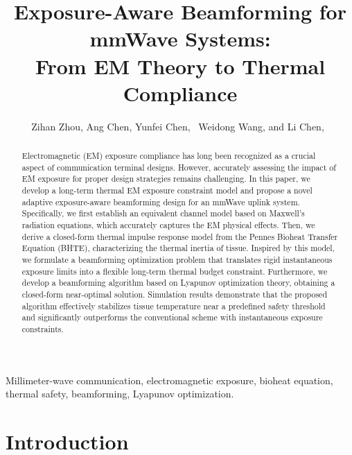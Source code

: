 \documentclass[journal]{IEEEtran}
\begin{document}
\title{Exposure-Aware Beamforming for mmWave Systems:\\From EM Theory to Thermal Compliance}

\author{Zihan Zhou, Ang Chen, Yunfei Chen,~
Weidong Wang, and Li Chen,~}

\maketitle

\begin{abstract}
Electromagnetic (EM) exposure compliance has long been recognized as a crucial aspect of communication terminal designs. However, accurately assessing the impact of EM exposure for proper design strategies remains challenging. In this paper, we develop a long-term thermal EM exposure constraint model and propose a novel adaptive exposure-aware beamforming design for an mmWave uplink system. Specifically, we first establish an equivalent channel model based on Maxwell's radiation equations, which accurately captures the EM physical effects. Then, we derive a closed-form thermal impulse response model from the Pennes Bioheat Transfer Equation (BHTE), characterizing the thermal inertia of tissue. Inspired by this model, we formulate a beamforming optimization problem that translates rigid instantaneous exposure limits into a flexible long-term thermal budget constraint. Furthermore, we develop a beamforming algorithm based on Lyapunov optimization theory, obtaining a closed-form near-optimal solution. Simulation results demonstrate that the proposed algorithm effectively stabilizes tissue temperature near a predefined safety threshold and significantly outperforms the conventional scheme with instantaneous exposure constraints.
\end{abstract}

\begin{IEEEkeywords}
Millimeter-wave communication, electromagnetic exposure, bioheat equation, thermal safety, beamforming, Lyapunov optimization.
\end{IEEEkeywords}


\section{Introduction}
\end{document}
